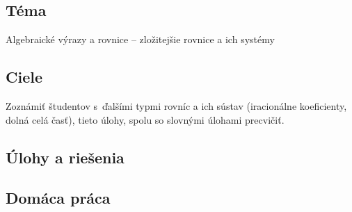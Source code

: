
\subsection*{Téma}
Algebraické výrazy a rovnice -- zložitejšie rovnice a ich systémy


\subsection*{Ciele}
Zoznámiť študentov s~ďalšími typmi rovníc a ich sústav (iracionálne koeficienty, dolná celá časť), tieto úlohy, spolu so slovnými úlohami precvičiť.


\subsection*{Úlohy a riešenia}



















\subsection*{Domáca práca}






